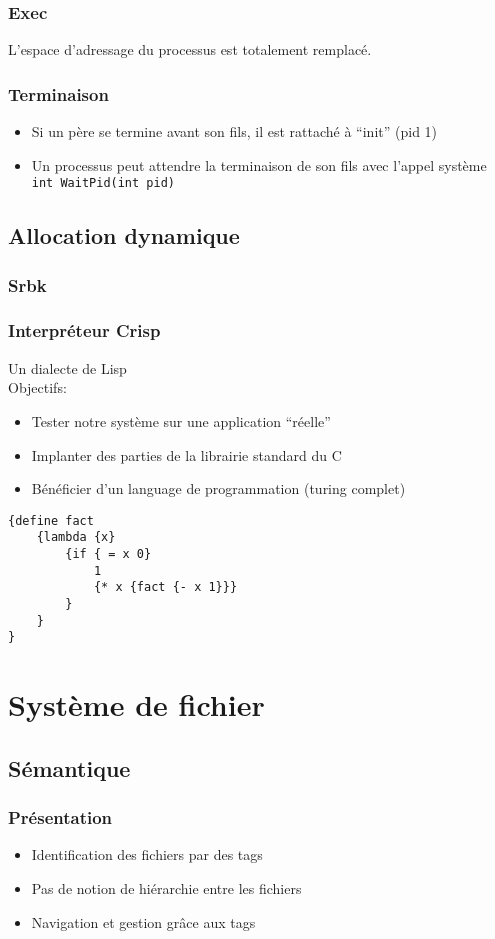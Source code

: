 \documentclass{beamer}
\begin{document}
\begin{frame}
  \frametitle{Exec}
  L'espace d'adressage du processus est totalement remplacé.
\end{frame}

\begin{frame}
  \frametitle{Terminaison}
  \begin{itemize}
    \item Si un père se termine avant son fils, il est rattaché à ``init'' (pid 1)
    \item Un processus peut attendre la terminaison de son fils avec l'appel système \texttt{int WaitPid(int pid)}
  \end{itemize}

\end{frame}


\subsection{Allocation dynamique}
\begin{frame}
  \frametitle{Srbk}
\end{frame}

\begin{frame}[fragile]
  \frametitle{Interpréteur Crisp}
  Un dialecte de Lisp\\
  Objectifs:
  \begin{itemize}
  \item Tester notre système sur une application ``réelle''
  \item Implanter des parties de la librairie standard du C
  \item Bénéficier d'un language de programmation (turing complet)
  \end{itemize}

  {\scriptsize
\begin{verbatim}
{define fact
    {lambda {x}
        {if { = x 0}
            1
            {* x {fact {- x 1}}}
        }
    }
}
\end{verbatim}
}
\end{frame}

\section{Système de fichier}
\subsection{Sémantique}
\begin{frame}
  \frametitle{Présentation}
  \begin{itemize}
  \item Identification des fichiers par des tags
  \item Pas de notion de hiérarchie entre les fichiers
  \item Navigation et gestion grâce aux tags
  \end{itemize}
\end{frame}
\end{document}
